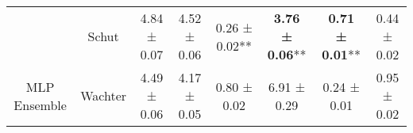 \begin{table}
{\begin{tabular}[t]{cccccccc}
 & Schut & 4.84 ± 0.07\hphantom{*}\hphantom{*} & 4.52 ± 0.06\hphantom{*}\hphantom{*} & 0.26 ± 0.02** & \textbf{3.76 ± 0.06}** & \textbf{0.71 ± 0.01}** & 0.44 ± 0.02\hphantom{*}\hphantom{*}\\

\multirow[t]{-7}{*}{\centering\arraybackslash MLP Ensemble} & Wachter & 4.49 ± 0.06\hphantom{*}\hphantom{*} & 4.17 ± 0.05\hphantom{*}\hphantom{*} & 0.80 ± 0.02\hphantom{*}\hphantom{*} & 6.91 ± 0.29\hphantom{*}\hphantom{*} & 0.24 ± 0.01\hphantom{*}\hphantom{*} & 0.95 ± 0.02\hphantom{*}\hphantom{*}\\
\bottomrule
\end{tabular}}
\end{table}
